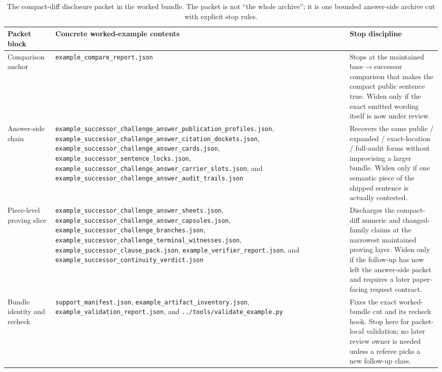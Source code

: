 \documentclass[11pt]{article}
\begin{document}
\begin{table}[t]
\centering
\small
\begin{tabularx}{\linewidth}{@{}l X X@{}}
\toprule
Packet block & Concrete worked-example contents & Stop discipline \\
\midrule
Comparison anchor & \nolinkurl{example_compare_report.json} & Stops at the maintained base$\to$successor comparison that makes the compact public sentence true. Widen only if the exact emitted wording itself is now under review. \\
Answer-side chain & \nolinkurl{example_successor_challenge_answer_publication_profiles.json}, \nolinkurl{example_successor_challenge_answer_citation_dockets.json}, \nolinkurl{example_successor_challenge_answer_cards.json}, \nolinkurl{example_successor_sentence_locks.json}, \nolinkurl{example_successor_challenge_answer_carrier_slots.json}, and \nolinkurl{example_successor_challenge_answer_audit_trails.json} & Recovers the same public / expanded / exact-location / full-audit forms without improvising a larger bundle. Widen only if one semantic piece of the shipped sentence is actually contested. \\
Piece-level proving slice & \nolinkurl{example_successor_challenge_answer_sheets.json}, \nolinkurl{example_successor_challenge_answer_capsules.json}, \nolinkurl{example_successor_challenge_branches.json}, \nolinkurl{example_successor_challenge_terminal_witnesses.json}, \nolinkurl{example_successor_clause_pack.json}, \nolinkurl{example_verifier_report.json}, and \nolinkurl{example_successor_continuity_verdict.json} & Discharges the compact-diff numeric and changed-family claims at the narrowest maintained proving layer. Widen only if the follow-up has now left the answer-side packet and requires a later paper-facing request contract. \\
Bundle identity and recheck & \nolinkurl{support_manifest.json}, \nolinkurl{example_artifact_inventory.json}, \nolinkurl{example_validation_report.json}, and \nolinkurl{../tools/validate_example.py} & Fixes the exact worked-bundle cut and its recheck hook. Stop here for packet-local validation; no later review owner is needed unless a referee picks a new follow-up class. \\
\bottomrule
\end{tabularx}
\caption{The compact-diff disclosure packet in the worked bundle. The packet is not ``the whole archive''; it is one bounded answer-side archive cut with explicit stop rules.}
\label{tab:answerdisclosurepacketcompactdiff}
\end{table}
\end{document}
